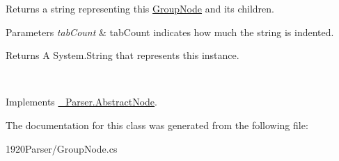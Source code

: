 Returns a string representing this \hyperlink{class__1920_parser_1_1_group_node}{Group\+Node} and its children. 


\begin{DoxyParams}{Parameters}
{\em tab\+Count} & tab\+Count indicates how much the string is indented. \begin{DoxyReturn}{Returns}
A System.\+String that represents this instance. 
\end{DoxyReturn}
\\
\hline
\end{DoxyParams}


Implements \hyperlink{class__1920_parser_1_1_abstract_node}{\+\_\+Parser.\+Abstract\+Node}.



The documentation for this class was generated from the following file\+:\begin{DoxyCompactItemize}
\item 
1920\+Parser/Group\+Node.\+cs\end{DoxyCompactItemize}
